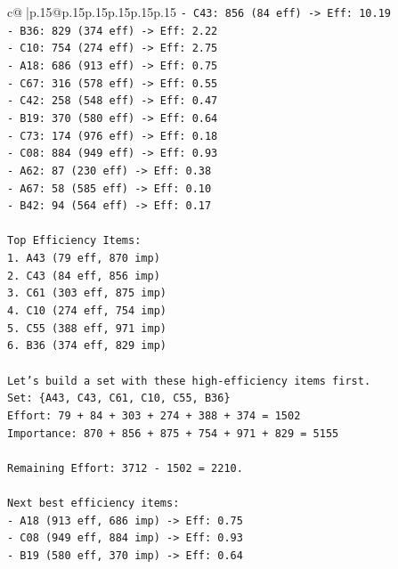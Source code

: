\documentclass{article}
\begin{document}
{\begin{supertabular}{c@{$\;$}|p{.15\linewidth}@{}p{.15\linewidth}p{.15\linewidth}p{.15\linewidth}p{.15\linewidth}p{.15\linewidth}}
{{{\texttt{{-} C43: 856 (84 eff) {-}> Eff: 10.19} \\
\texttt{{-} B36: 829 (374 eff) {-}> Eff: 2.22} \\
\texttt{{-} C10: 754 (274 eff) {-}> Eff: 2.75} \\
\texttt{{-} A18: 686 (913 eff) {-}> Eff: 0.75} \\
\texttt{{-} C67: 316 (578 eff) {-}> Eff: 0.55} \\
\texttt{{-} C42: 258 (548 eff) {-}> Eff: 0.47} \\
\texttt{{-} B19: 370 (580 eff) {-}> Eff: 0.64} \\
\texttt{{-} C73: 174 (976 eff) {-}> Eff: 0.18} \\
\texttt{{-} C08: 884 (949 eff) {-}> Eff: 0.93} \\
\texttt{{-} A62: 87 (230 eff) {-}> Eff: 0.38} \\
\texttt{{-} A67: 58 (585 eff) {-}> Eff: 0.10} \\
\texttt{{-} B42: 94 (564 eff) {-}> Eff: 0.17} \\
\\ 
\texttt{Top Efficiency Items:} \\
\texttt{1. A43 (79 eff, 870 imp)} \\
\texttt{2. C43 (84 eff, 856 imp)} \\
\texttt{3. C61 (303 eff, 875 imp)} \\
\texttt{4. C10 (274 eff, 754 imp)} \\
\texttt{5. C55 (388 eff, 971 imp)} \\
\texttt{6. B36 (374 eff, 829 imp)} \\
\\ 
\texttt{Let's build a set with these high{-}efficiency items first.} \\
\texttt{Set: \{A43, C43, C61, C10, C55, B36\}} \\
\texttt{Effort: 79 + 84 + 303 + 274 + 388 + 374 = 1502} \\
\texttt{Importance: 870 + 856 + 875 + 754 + 971 + 829 = 5155} \\
\\ 
\texttt{Remaining Effort: 3712 {-} 1502 = 2210.} \\
\\ 
\texttt{Next best efficiency items:} \\
\texttt{{-} A18 (913 eff, 686 imp) {-}> Eff: 0.75} \\
\texttt{{-} C08 (949 eff, 884 imp) {-}> Eff: 0.93} \\
\texttt{{-} B19 (580 eff, 370 imp) {-}> Eff: 0.64} \\
}}}
\end{supertabular}}
\end{document}
